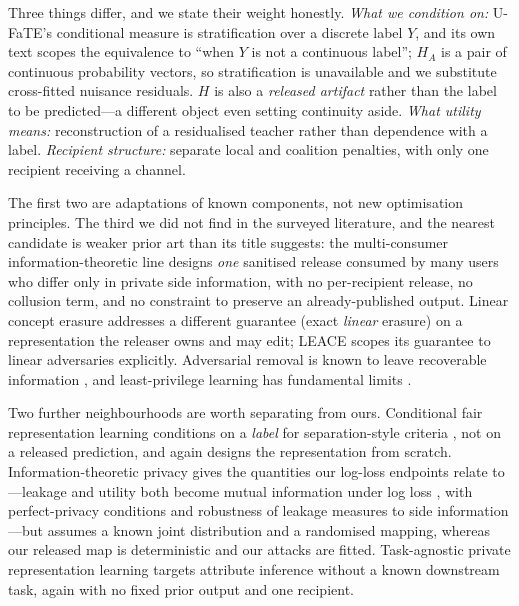\documentclass[10pt]{article}
\begin{document}
Three things differ, and we state their weight honestly. \emph{What we condition on:} U-FaTE's
conditional measure is stratification over a discrete label $Y$, and its own text scopes the
equivalence to ``when $Y$ is not a continuous label''; $H_A$ is a pair of continuous probability
vectors, so stratification is unavailable and we substitute cross-fitted nuisance residuals. $H$ is
also a \emph{released artifact} rather than the label to be predicted---a different object even
setting continuity aside. \emph{What utility means:} reconstruction of a residualised teacher
rather than dependence with a label. \emph{Recipient structure:} separate local and coalition
penalties, with only one recipient receiving a channel.

The first two are adaptations of known components, not new optimisation principles. The third we
did not find in the surveyed literature, and the nearest candidate is weaker prior art than its
title suggests: the multi-consumer information-theoretic line \citep{sankar2013utility} designs
\emph{one} sanitised release consumed by many users who differ only in private side information,
with no per-recipient release, no collusion term, and no constraint to preserve an already-published
output. Linear concept erasure \citep{belrose2023leace,holstege2025splince} addresses a different
guarantee (exact \emph{linear} erasure) on a representation the releaser owns and may edit; LEACE
scopes its guarantee to linear adversaries explicitly. Adversarial removal is known to leave
recoverable information \citep{elazar2018adversarial}, and least-privilege learning has fundamental
limits \citep{stadler2024leastprivilege}.

Two further neighbourhoods are worth separating from ours. Conditional fair representation learning
conditions on a \emph{label} for separation-style criteria \citep{zhao2019conditional,hwa2024enforcing},
not on a released prediction, and again designs the representation from scratch.
Information-theoretic privacy gives the quantities our log-loss endpoints relate to---leakage and
utility both become mutual information under log loss \citep{makhdoumi2014funnel}, with
perfect-privacy conditions \citep{rassouli2021perfect} and robustness of leakage measures to side
information \citep{liao2019sideinfo}---but assumes a known joint distribution and a randomised
mapping, whereas our released map is deterministic and our attacks are fitted. Task-agnostic
private representation learning \citep{arevalo2024tappfl} targets attribute inference without a
known downstream task, again with no fixed prior output and one recipient.
\end{document}
